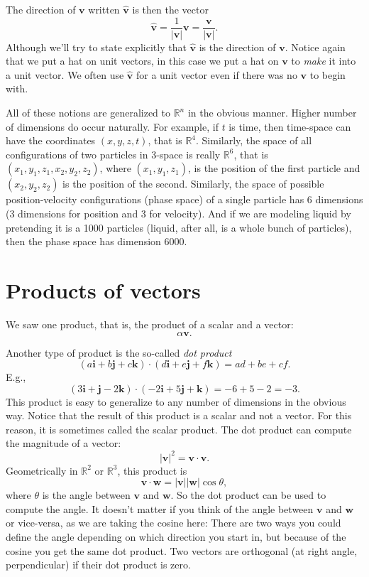 \documentclass[12pt]{article}
\newcommand{\sabs}[1]{\lvert {#1} \rvert}
\newcommand{\R}{{\mathbb{R}}}
\newcommand{\veci}{\mathbf{i}}
\newcommand{\vecj}{\mathbf{j}}
\newcommand{\veck}{\mathbf{k}}
\begin{document}
The direction of $\mathbf{v}$ written $\hat{\mathbf{v}}$ is then
the vector
\[
\hat{\mathbf{v}} = \frac{1}{\sabs{\mathbf{v}}} \mathbf{v} = \frac{\mathbf{v}}{\sabs{\mathbf{v}}} .
\]
Although we'll try to state explicitly that $\hat{\mathbf{v}}$  is the direction of $\mathbf{v}$.
Notice again that we put a hat on unit vectors, in this case we put a hat
on $\mathbf{v}$ to \emph{make} it into a unit vector.
We often use $\hat{\mathbf{v}}$ for a unit vector even if there was no
$\mathbf{v}$ to begin with.

All of these notions are generalized to $\R^n$ in the obvious manner.
Higher number of dimensions do occur naturally.
For example, if $t$ is time, then time-space can have the coordinates $(x,y,z,t)$,
that is $\R^4$.  Similarly, the space of all configurations of two particles in 3-space
is really $\R^6$, that is $(x_1,y_1,z_1,x_2,y_2,z_2)$, where
$(x_1,y_1,z_1)$, is the position of the first particle and $(x_2,y_2,z_2)$ is
the position of the second.
Similarly, the space of possible
position-velocity configurations (phase space)
of a single particle has 6 dimensions
(3 dimensions for position and 3 for velocity).
And if we are modeling liquid by pretending it
is a 1000 particles (liquid, after all,
is a whole bunch of particles),
then the phase space has dimension 6000.


\section{Products of vectors}

We saw one product, that is, the product of a scalar and a vector:
\[
\alpha \mathbf{v}.
\]

Another type of product is the so-called \emph{dot product}
\[
( a \veci + b \vecj + c \veck ) \cdot
( d \veci + e \vecj + f \veck ) =
ad + be + cf .
\]
E.g.,
\[
( 3 \veci + \vecj -2 \veck ) \cdot
( - 2\veci + 5 \vecj + \veck ) =
-6 + 5 -2 = -3 .
\]
This product is easy to generalize to any number of dimensions in the obvious way.
Notice that the result of this product is a scalar and not a vector.
For this reason, it is sometimes called the scalar product.
The dot product can compute the magnitude of a vector:
\[
\sabs{\mathbf{v}}^2 = \mathbf{v} \cdot \mathbf{v} .
\]
Geometrically in $\R^2$ or $\R^3$, this product is
\[
\mathbf{v} \cdot \mathbf{w} = \sabs{\mathbf{v}} \sabs{\mathbf{w}} \cos \theta ,
\]
where $\theta$ is the angle between $\mathbf{v}$ and $\mathbf{w}$.
So the dot product can be used to compute the angle.
It doesn't matter if you think of the angle
between $\mathbf{v}$ and $\mathbf{w}$ or vice-versa, as we are taking the cosine here:
There are two ways you could define the angle depending on which direction you start in,
but because of the cosine you get the same dot product.
Two vectors are orthogonal
(at right angle, perpendicular) if their dot product is zero.
\end{document}

